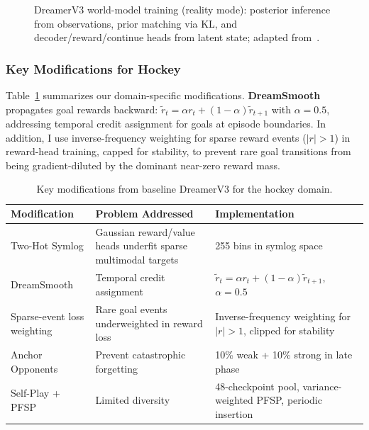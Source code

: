 \documentclass[11pt]{article}
\begin{document}
\begin{figure}[htbp]
{
}
\caption{DreamerV3 world-model training (reality mode): posterior inference from observations, prior matching via KL, and decoder/reward/continue heads from latent state; adapted from~\cite{hafner2024,naturaldreamer}.}
\label{fig:world_model}
\end{figure}

\subsubsection{Key Modifications for Hockey}

Table~\ref{tab:modifications} summarizes our domain-specific modifications. \textbf{DreamSmooth}~\cite{dreamsmooth2023} propagates goal rewards backward: $\tilde{r}_t = \alpha r_t + (1-\alpha)\tilde{r}_{t+1}$ with $\alpha = 0.5$, addressing temporal credit assignment for goals at episode boundaries. In addition, I use inverse-frequency weighting for sparse reward events ($|r|>1$) in reward-head training, capped for stability, to prevent rare goal transitions from being gradient-diluted by the dominant near-zero reward mass.

\begin{table}[h]
\centering
\small
\begin{tabular}{lp{4.2cm}p{4.8cm}}
\toprule
\textbf{Modification} & \textbf{Problem Addressed} & \textbf{Implementation} \\
\midrule
Two-Hot Symlog & Gaussian reward/value heads underfit sparse multimodal targets & 255 bins in symlog space \\
DreamSmooth & Temporal credit assignment & $\tilde{r}_t = \alpha r_t + (1-\alpha)\tilde{r}_{t+1}$, $\alpha=0.5$ \\
Sparse-event loss weighting & Rare goal events underweighted in reward loss & Inverse-frequency weighting for $|r|>1$, clipped for stability \\
Anchor Opponents & Prevent catastrophic forgetting & 10\% weak + 10\% strong in late phase \\
Self-Play + PFSP~\cite{vinyals2019} & Limited diversity & 48-checkpoint pool, variance-weighted PFSP, periodic insertion \\
\bottomrule
\end{tabular}
\caption{Key modifications from baseline DreamerV3 for the hockey domain.}
\label{tab:modifications}
\end{table}
\end{document}
